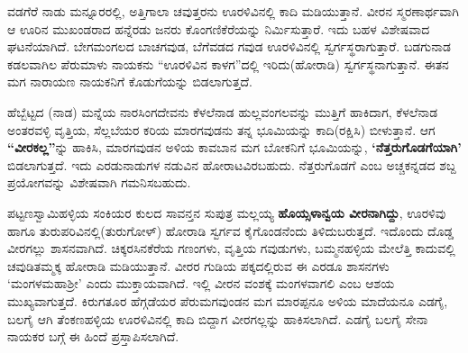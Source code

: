 ವಡಗೆರೆ ನಾಡು ಮನ್ನೂರರಲ್ಲಿ, ಅತ್ತಿಗಾಲಾ ಚವುತ್ತರನು ಊರಳಿವಿನಲ್ಲಿ ಕಾದಿ ಮಡಿಯುತ್ತಾನೆ. ವೀರನ ಸ್ಮರಣಾರ್ಥವಾಗಿ ಆ ಊರಿನ ಮುಖಂಡರಾದ ಹನ್ನೆರಡು ಜನರು ಕೊಂಗಣಿಕೆರೆಯನ್ನು ನಿರ್ಮಿಸುತ್ತಾರೆ. ಇದು ಬಹಳ ವಿಶೇಷವಾದ ಘಟನೆಯಾಗಿದೆ. ಬೇಗಮಂಗಲದ ಬಾಚಗವುಡ, ಬೆಗೆವಡದ ಗವುಡ ಊರಳಿವಿನಲ್ಲಿ ಸ್ವರ್ಗಸ್ಥರಾಗುತ್ತಾರೆ. ಬಡಗುನಾಡ ಕಡಲವಾಗಿಲ ಪೆರುಮಾಳು ನಾಯಕನು “ಊರಳಿವಿನ ಕಾಳಗ”ದಲ್ಲಿ ಇರಿದು(ಹೋರಾಡಿ) ಸ್ವರ್ಗಸ್ಥನಾಗುತ್ತಾನೆ. ಈತನ ಮಗ ನಾರಾಯಣ ನಾಯಕನಿಗೆ ಕೊಡುಗೆಯನ್ನು ಬಿಡಲಾಗುತ್ತದೆ.

ಹೆಬ್ಬೆಟ್ಟದ (ನಾಡ) ಮನ್ನೆಯ ನಾರಸಿಂಗದೇವನು ಕೆಳಲೆನಾಡ ಹುಲ್ಲವಂಗಲವನ್ನು ಮುತ್ತಿಗೆ ಹಾಕಿದಾಗ, ಕೆಳಲೆನಾಡ ಅಂತರವಳ್ಳಿ ವೃತ್ತಿಯ, ಸೆಲ್ಲಬೆಯರ ಕರಿಯ ಮಾರಗವುಡನು ತನ್ನ ಭೂಮಿಯನ್ನು ಕಾದಿ(ರಕ್ಷಿಸಿ) ಬೀಳುತ್ತಾನೆ. ಆಗ \textbf{“ವೀರಕಲ್ಲ”}ನ್ನು ಹಾಕಿಸಿ, ಮಾರಗವುಡನ ಅಳಿಯ ಕಾವಬಾನ ಮಗ ಬೋಕನಿಗೆ ಭೂಮಿಯನ್ನು, \textbf{‘ನೆತ್ತರುಗೊಡಗೆಯಾಗಿ’} ಬಿಡಲಾಗುತ್ತದೆ. ಇದು ಎರಡುನಾಡುಗಳ ನಡುವಿನ ಹೋರಾಟವಿರಬಹುದು. ನೆತ್ತರುಗೊಡಗೆ ಎಂಬ ಅಚ್ಚಕನ್ನಡದ ಶಬ್ದ ಪ್ರಯೋಗವನ್ನು ವಿಶೇಷವಾಗಿ ಗಮನಿಸಬಹುದು.

\newpage

ಪಟ್ಟಣಸ್ವಾಮಿಹಳ್ಳಿಯ ಸಂಕಿಯರ ಕುಲದ ಸಾವನ್ತನ ಸುಪುತ್ರ ಮಲ್ಲಯ್ಯ \textbf{ಹೊಯ್ಸಳಾನ್ವಯ ವೀರನಾಗಿದ್ದು}, ಊರಳಿವು ಹಾಗೂ ತುರುಪರಿವಿನಲ್ಲಿ(ತುರುಗೋಳ್​) ಹೋರಾಡಿ ಸ್ವರ್ಗವ ಕೈಗೊಂಡನೆಂದು ತಿಳಿದುಬರುತ್ತದೆ. ಇದೊಂದು ದೊಡ್ಡ ವೀರಗಲ್ಲು ಶಾಸನವಾಗಿದೆ. ಚಿಕ್ಕರಸಿನಕೆರೆಯ ಗಣಂಗಳು, ವೃತ್ತಿಯ ಗವುಡುಗಳು, ಬಮ್ಮನಹಳ್ಳಿಯ ಮೇಲೆತ್ತಿ ಕಾದುವಲ್ಲಿ ಚವುಡಿತಮ್ಮಕ್ಕ ಹೋರಾಡಿ ಮಡಿಯುತ್ತಾನೆ. ವೀರರ ಗುಡಿಯ ಪಕ್ಕದಲ್ಲಿರುವ ಈ ಎರಡೂ ಶಾಸನಗಳು ‘ಮಂಗಳಮಹಾಶ‍್ರೀ’ ಎಂದು ಮುಕ್ತಾಯವಾಗಿದೆ. ಇಲ್ಲಿ ವೀರನ ವಂಶಕ್ಕೆ ಮಂಗಳವಾಗಲಿ ಎಂಬ ಆಶಯ ಮುಖ್ಯವಾಗುತ್ತದೆ. ಕಿರುಗತೂರ ಹೆಗ್ಗಡೆಯರ ಪೆರುಮಗವುಂಡನ ಮಗ ಮಾರಪ್ಪನೂ ಅಳಿಯ ಮಾದೆಯನೂ ಎಡಗೈ, ಬಲಗೈ ಆಗಿ ತೆಂಕಣಹಳ್ಳಿಯ ಊರಳಿವಿನಲ್ಲಿ ಕಾದಿ ಬಿದ್ದಾಗ ವೀರಗಲ್ಲನ್ನು ಹಾಕಿಸಲಾಗಿದೆ. ಎಡಗೈ ಬಲಗೈ ಸೇನಾ ನಾಯಕರ ಬಗ್ಗೆ ಈ ಹಿಂದೆ ಪ್ರಸ್ತಾಪಿಸಲಾಗಿದೆ.

\vskip -2pt

